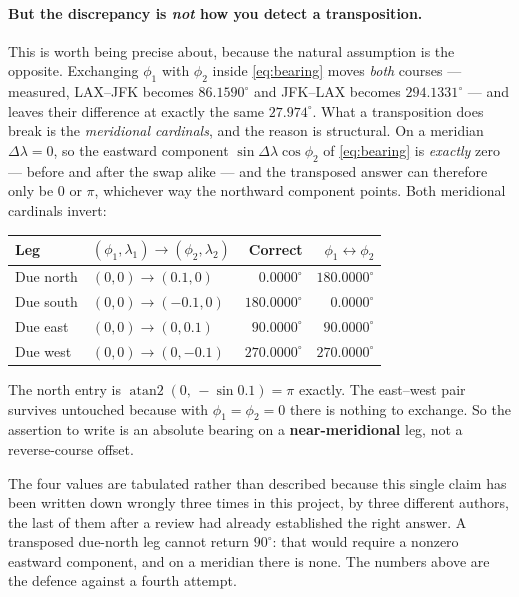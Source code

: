 \documentclass[11pt]{article}
\begin{document}
\paragraph{But the discrepancy is \emph{not} how you detect a transposition.}
This is worth being precise about, because the natural assumption is the
opposite. Exchanging $\phi_1$ with $\phi_2$ inside \eqref{eq:bearing} moves
\emph{both} courses --- measured, LAX--JFK becomes $86.1590^{\circ}$ and
JFK--LAX becomes $294.1331^{\circ}$ --- and leaves their difference at exactly
the same $27.974^{\circ}$. What a transposition does break is the
\emph{meridional cardinals}, and the reason is structural. On a meridian
$\Delta\lambda = 0$, so the eastward component $\sin\Delta\lambda\cos\phi_2$
of \eqref{eq:bearing} is \emph{exactly} zero --- before and after the swap
alike --- and the transposed answer can therefore only be $0$ or $\pi$,
whichever way the northward component points. Both meridional cardinals invert:

\begin{center}
\begin{tabular}{llrr}
\toprule
Leg & $(\phi_1,\lambda_1)\to(\phi_2,\lambda_2)$ & Correct & $\phi_1\!\leftrightarrow\!\phi_2$ \\
\midrule
Due north & $(0,0)\to(0.1,0)$   & $0.0000^{\circ}$   & $180.0000^{\circ}$ \\
Due south & $(0,0)\to(-0.1,0)$  & $180.0000^{\circ}$ & $0.0000^{\circ}$ \\
Due east  & $(0,0)\to(0,0.1)$   & $90.0000^{\circ}$  & $90.0000^{\circ}$ \\
Due west  & $(0,0)\to(0,-0.1)$  & $270.0000^{\circ}$ & $270.0000^{\circ}$ \\
\bottomrule
\end{tabular}
\end{center}

The north entry is $\operatorname{atan2}(0,\,-\sin 0.1) = \pi$ exactly. The
east--west pair survives untouched because with $\phi_1 = \phi_2 = 0$ there is
nothing to exchange. So the assertion to write is an absolute bearing on a
\textbf{near-meridional} leg, not a reverse-course offset.

The four values are tabulated rather than described because this single claim
has been written down wrongly three times in this project, by three different
authors, the last of them after a review had already established the right
answer. A transposed due-north leg cannot return $90^{\circ}$: that would
require a nonzero eastward component, and on a meridian there is none. The
numbers above are the defence against a fourth attempt.
\end{document}
